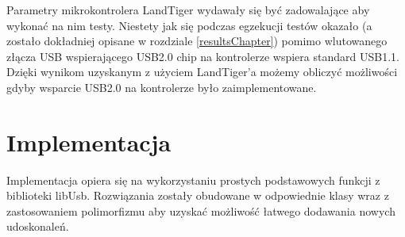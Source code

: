 \documentclass{BscUS}
\begin{document}
Parametry mikrokontrolera LandTiger wydawały się być zadowalające aby wykonać na nim testy. Niestety jak się podczas egzekucji testów okazało (a zostało dokładniej opisane w rozdziale \ref{resultsChapter}) pomimo wlutowanego złącza USB wspierającego USB2.0 chip na kontrolerze wspiera standard USB1.1. Dzięki wynikom uzyskanym z użyciem LandTiger'a możemy obliczyć możliwości gdyby wsparcie USB2.0 na kontrolerze było zaimplementowane.

\chapter{Implementacja}
\label{implementationChapter}
Implementacja opiera się na wykorzystaniu prostych podstawowych funkcji z biblioteki libUsb. Rozwiązania zostały obudowane w odpowiednie klasy wraz z zastosowaniem polimorfizmu aby uzyskać możliwość łatwego dodawania nowych udoskonaleń.
\end{document}
